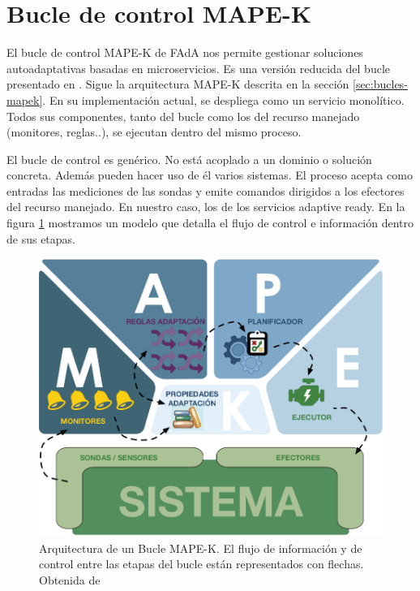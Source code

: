 \section{Bucle de control MAPE-K }

El bucle de control MAPE-K  de FAdA nos permite gestionar soluciones autoadaptativas basadas en microservicios. Es una versión reducida del bucle presentado en \cite{fonsEspecificacionSistemasAutoadaptativos2021}. Sigue la arquitectura MAPE-K descrita en la sección \ref{sec:bucles-mapek}. En su implementación actual, se despliega como un servicio monolítico. Todos sus componentes, tanto del bucle como los del recurso manejado (monitores, reglas..), se ejecutan dentro del mismo proceso.

El bucle de control es genérico. No está acoplado a un dominio o solución concreta. Además pueden hacer uso de él varios sistemas. El proceso acepta como entradas las mediciones de las sondas y emite comandos dirigidos a los efectores del recurso manejado. En nuestro caso, los  de los servicios adaptive ready. En la figura \ref{fig:bucle-mapek3} mostramos un modelo que detalla el flujo de control e información dentro de sus etapas.

\begin{figure}[htb]
  \centering
  \includegraphics[scale=1]{cap_introduccion/images/bucle-mape-k}
  \caption[Arquitectura de un Bucle MAPE-K. El flujo de información y de control entre las etapas del bucle están representados con flechas.]{Arquitectura de un Bucle MAPE-K. El flujo de información y de control entre las etapas del bucle están representados con flechas. Obtenida de \cite{fonsEspecificacionSistemasAutoadaptativos2021}}
  \label{fig:bucle-mapek3}
\end{figure}

